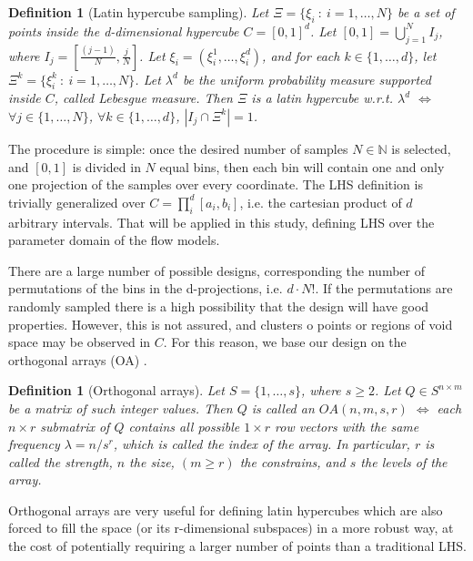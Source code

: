 \documentclass{article}
\newtheorem{definition}[theorem]{Definition}
\begin{document}
\begin{definition}[Latin hypercube sampling]
Let $\Xi=\{\xi_i\ :\ i=1,\dots,N\}$ be a set of points inside the d-dimensional hypercube $C=[0,1]^d$. Let $[0,1]=\bigcup_{j=1}^{N} I_j$, where $I_j=[\frac{(j-1)}{N},\frac{j}{N}]$. Let $\xi_i=\left(\xi_i^1,\dots,\xi_i^d\right)$, and for each $k\in\{1,\dots,d\}$, let $\Xi^k=\{\xi^k_i\ :\ i=1,\dots,N\}$. Let $\lambda^d$ be the uniform probability measure supported inside $C$, called Lebesgue measure. Then $\Xi$ is a latin hypercube w.r.t. $\lambda^d$ $\Longleftrightarrow$ $\forall j\in \{1,\dots,N\}$, $\forall k\in\{1,\dots,d\}$, $\left|I_j\cap\Xi^k\right|=1$.
\end{definition}

The procedure is simple: once the desired number of samples $N\in\mathbb N$ is selected, and $[0,1]$ is divided in $N$ equal bins, then each bin will contain one and only one projection of the samples over every coordinate. The LHS definition is trivially generalized over $C=\prod^d_i [a_i, b_i]$, i.e. the cartesian product of $d$ arbitrary intervals. That will be applied in this study, defining LHS over the parameter domain of the flow models.

There are a large number of possible designs, corresponding the number of permutations of the bins in the d-projections, i.e. $d\cdot N!$. If the permutations are randomly sampled there is a high possibility that the design will have good properties. However, this is not assured, and clusters o points or regions of void space may be observed in $C$. For this reason, we base our design on the orthogonal arrays (OA) \citep{Owen1992,Tang1993}.

\begin{definition}[Orthogonal arrays]
Let $S=\{1,\dots,s\}$, where $s\ge 2$. Let $Q\in S^{n\times m}$ be a matrix of such integer values. Then $Q$ is called an $OA(n,m,s,r)$ $\Longleftrightarrow$ each $n\times r$ submatrix of $Q$ contains all possible $1\times r$ row vectors with the same frequency $\lambda=n/s^r$, which is called the index of the array. In particular, $r$ is called the strength, $n$ the size, $(m\ge r)$ the constrains, and $s$ the levels of the array.
\end{definition}

Orthogonal arrays are very useful for defining latin hypercubes which are also forced to fill the space (or its r-dimensional subspaces) in a more robust way, at the cost of potentially requiring a larger number of points than a traditional LHS.
\end{document}
